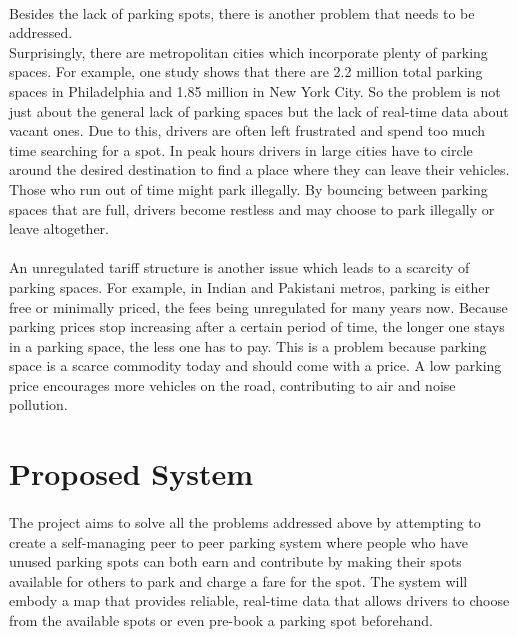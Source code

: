     \paragraph*{}
    Besides the lack of parking spots, there is another problem that needs to be addressed.\\ Surprisingly, there are metropolitan cities which incorporate plenty of parking spaces.
    For example, one study shows that there are 2.2 million total parking spaces in Philadelphia and 1.85 million in New York City. So the problem is not just about the general lack of parking spaces but the lack of real-time data about vacant ones. Due to this, drivers are often left frustrated and spend too much time searching for a spot. In peak hours drivers in large cities have to circle around the desired destination to find a place where they can leave their vehicles. Those who run out of time might park illegally. By bouncing between parking spaces that are full, drivers become restless and may choose to park illegally or leave altogether. 

    \paragraph*{}
    An unregulated tariff structure is another issue which leads to a scarcity of parking spaces. For example, in Indian and Pakistani metros, parking is either free or minimally priced, the fees being unregulated for many years now. Because parking prices stop increasing after a certain period of time, the longer one stays in a parking space, the less one has to pay. This is a problem because parking space is a scarce commodity today and should come with a price. A low parking price encourages more vehicles on the road, contributing to air and noise pollution.

    \section{Proposed System}
    \paragraph*{}
    The project aims to solve all the problems addressed above by attempting to create a self-managing peer to peer parking system where people who have unused parking spots can both earn and contribute by making their spots available for others to park and charge a fare for the spot. The system will embody a map that provides reliable, real-time data that allows drivers to choose from the available spots or even pre-book a parking spot beforehand.


